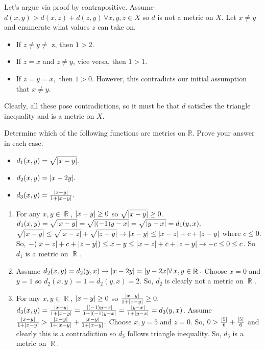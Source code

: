 \documentclass[12pt,letterpaper,boxed]{hmcpset}
\DeclarePairedDelimiter\abs{\lvert}{\rvert}
\DeclareMathOperator{\R}{\mathbb{R}}
\begin{document}
\begin{solution}
Let's argue via proof by contrapositive. Assume $d(x, y) > d(x, z) + d(z, y) \, \forall x, y, z \in X$ so $d$ is not a metric on $X.$ Let $x \neq y$ and enumerate what values $z$ can take on. 
\vspace{-2mm}
\begin{itemize}
	\itemsep0em
	\item If $z \neq y \neq$ z, then $1 > 2.$
	\item If $z = x$ and $z \neq y$, vice versa, then $1 > 1.$
	\item If $z = y = x,$ then $1 > 0.$ However, this contradicts our initial assumption that $x \neq y.$
\end{itemize}
Clearly, all these pose contradictions, so it must be that $d$ satisfies the triangle inequality and is a metric on $X$.

\end{solution}

\begin{problem}[Exercise 2.4.]
Determine which of the following functions are metrics on $\mathbb{R}$. Prove your answer in each case.
\vspace{-2mm}
\begin{itemize}
	\itemsep0em
	\item $d_1(x,y)=\sqrt{\abs{x - y}}.$
	\item $d_2(x,y)=\abs{x - 2y}.$
	\item $d_3(x,y)=\frac{\abs{x - y}}{1 + \abs{x - y}}.$
\end{itemize}
\end{problem}
\begin{solution}
\vspace{-2mm}
\begin{enumerate}
	\itemsep0em
	\item For any $x,y \in \R$, $\abs{x - y}\ge 0$ so $\sqrt{\abs{x - y}}\ge 0$. $d_1(x,y)= \sqrt{\abs{x - y}}= \sqrt{\abs{(-1)y -x}} = \sqrt{\abs{y -x}}=d_1(y,x).$ $\sqrt{\abs{x - y}} \leq \sqrt{\abs{x - z}} + \sqrt{\abs{z - y}} \rightarrow \abs{x - y} \leq \abs{x-z} + c + \abs{z - y}$ where $c \leq 0$. So, $-(\abs{x-z} + c + \abs{z - y}) \leq x - y \leq \abs{x-z} + c + \abs{z - y} \rightarrow -c \leq 0 \leq c$. So $d_1$ is a metric on $\R.$ 
	\item Assume $d_2(x,y)=d_2(y,x)\rightarrow \abs{x - 2y} = \abs{y - 2x} \forall \, x, y \in \R.$ Choose $x=0$ and $y=1$ so $d_2(x,y)=1=d_2(y,x)=2$. So, $d_2$ is clearly not a metric on $\R.$
	\item For any $x,y \in \R$, $\abs{x - y}\ge 0$ so $\frac{\abs{x - y}}{1 + \abs{x - y}} \ge 0.$ $d_3(x,y)= \frac{\abs{x - y}}{1 + \abs{x - y}}= \frac{\abs{(-1)y -x}}{1 + \abs{(-1)y -x}} = \frac{\abs{y -x}}{1 + \abs{y -x}} =d_3(y,x)$. Assume $\frac{\abs{x - y}}{1 + \abs{x - y}} > \frac{\abs{x - y}}{1 + \abs{x - y}} + \frac{\abs{x - y}}{1 + \abs{x - y}}.$ Choose $x, y = 5$ and $z = 0$. So, $0 > \frac{\abs{5}}{6} + \frac{\abs{5}}{6}$ and clearly this is a contradiction so $d_3$ follows triangle inequality. So, $d_3$ is a metric on $\R$.
\end{enumerate}
\end{solution}
\end{document}
